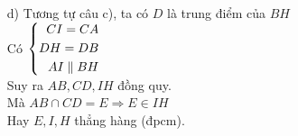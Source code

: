 \begin{ex}
{\begin{enumerate}
{
    	}
    \\ Lại có  $ \widehat{AOM} $ là góc ở tâm chắn cung $ AM $
    \\ $ \Rightarrow \widehat{AOM}=2\widehat{OBM} $ (2)
    \\ Từ (1) và (2) suy ra $ \widehat{AOC}=\widehat{OBM} $
    \\ $ \Rightarrow OC \parallel BM $
    \\ $ \Delta AIB $ có $ \heva{OC \parallel BM \\ OA=OB} $
    \\ $ \Rightarrow CI=CA $
    \\ Hay $ C $ là trung điểm của $ AI $.
    		\item[d)] Tương tự câu c), ta có $ D $ là trung điểm của $ BH $
    		\\ Có $ \left\{\begin{aligned}CI=CA\\ DH=DB\\ AI \parallel BH\end{aligned}\right.$ 
    		\\ Suy ra $ AB,CD,IH $ đồng quy.
    		\\ Mà $ AB \cap CD=E  \Rightarrow E \in IH$
    		\\ Hay $ E,I,H $ thẳng hàng (đpcm).
    \end{enumerate}}
\end{ex}
